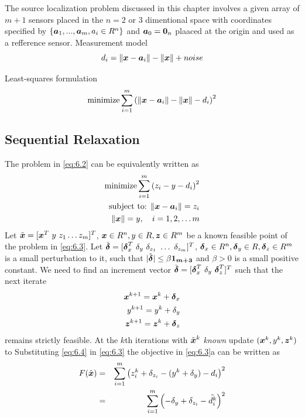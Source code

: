 The source localization problem discussed in this chapter involves a given array of $m+1$ sensors placed in the $n = 2$ or 3 dimentional space with coordinates specified by $\{\mbox{\boldmath$a$}_1, . . . , \mbox{\boldmath$a$}_m , a_i \in R^n\}$ and  $\mbox{\boldmath$a$}_0 = \mbox{\boldmath${0}$}_n$ plaaced at the origin and used as a refference sensor.
Measurement model
\begin{equation} \label{eq:6.1}
d_i = \|\mbox{\boldmath$x$} - \mbox{\boldmath$a$}_i\| - \|\mbox{\boldmath$x$}\| + noise
\end{equation}


Least-squares formulation
\begin{equation} \label{eq:6.2}
\mathop{\mbox{minimize}} \sum^m_{i=1}\left( \|\mbox{\boldmath$x$} - \mbox{\boldmath$a$}_i\| - \|\mbox{\boldmath$x$}\| - d_i\right)^2
\end{equation}

\subsection{Sequential Relaxation}
The problem in \ref{eq:6.2} can be equivalently written as
\begin{eqnarray} \label{eq:6.3}
\mathop{\mbox{minimize}} \sum^m_{i=1}\left( z_i - y - d_i\right)^2\\
\nonumber
\mbox{subject to: } \|\mbox{\boldmath$x$} - \mbox{\boldmath$a$}_i\| = z_i \\
\nonumber
\|\mbox{\boldmath$x$}\|  = y, \quad  i = 1, 2, \ldots m
\end{eqnarray}
Let $\tilde{\mbox{\boldmath$x$}} = [\mbox{\boldmath$x$}^T \ y \ z_1 \ldots z_m]^T$, $\mbox{\boldmath$x$} \in R^n, y \in R, \mbox{\boldmath$z$} \in R^m$ be a known feasible point of the problem in \ref{eq:6.3}. Let $\tilde{\Bdelta} = [\Bdelta_x^T \  \delta_y \ \delta_{z_1} \ \ldots \  \delta_{z_m}]^T$, $\mbox{\boldmath${\delta}$}_x \in R^n, \mbox{\boldmath${\delta}$}_y \in R, \mbox{\boldmath${\delta}$}_z \in R^m$ is a small perturbation to it, such that $|\tilde{\mbox{\boldmath${\delta}$}}| \leq \beta\mbox{\boldmath${1_{m+3}}$}$ and $\beta > 0$ is a small positive constant. We need to find an increment vector $\tilde{\Bdelta} = [\Bdelta_x^T \  \delta_y \ \Bdelta_{z}^T]^T$ such that the next iterate
\begin{eqnarray} \label{eq:6.4}
\mbox{\boldmath$x$}^{k+1} = \mbox{\boldmath$x$}^k + \mbox{\boldmath${\delta}$}_x \\
\nonumber
y^{k+1} = y^k + \delta_y \\
\nonumber
\mbox{\boldmath$z$}^{k+1} = \mbox{\boldmath$z$}^k + \mbox{\boldmath${\delta}$}_z
\end{eqnarray}
remains strictly feasible. 
At the $k$th iterations with $\tilde{\mbox{\boldmath$x$}}^k$ \textit{known} update $(\mbox{\boldmath$x$}^k, y^k, \mbox{\boldmath$z$}^k)$ to 
Substituting \ref{eq:6.4} in \ref{eq:6.3} the objective in \ref{eq:6.3}a can be written as
\begin{eqnarray} \label{eq:6.5}
F(\hat{\mbox{\boldmath$x$}}) & =  & \sum^m_{i = 1} \left(z^k_i + \delta_{z_i} - (y^k + \delta_y) - d_i \right)^2 \\
\nonumber
& = & \sum^m_{i = 1} \left(- \delta_y + \delta_{z_i}  - \tilde{d_i^k} \right)^2
\end{eqnarray}
